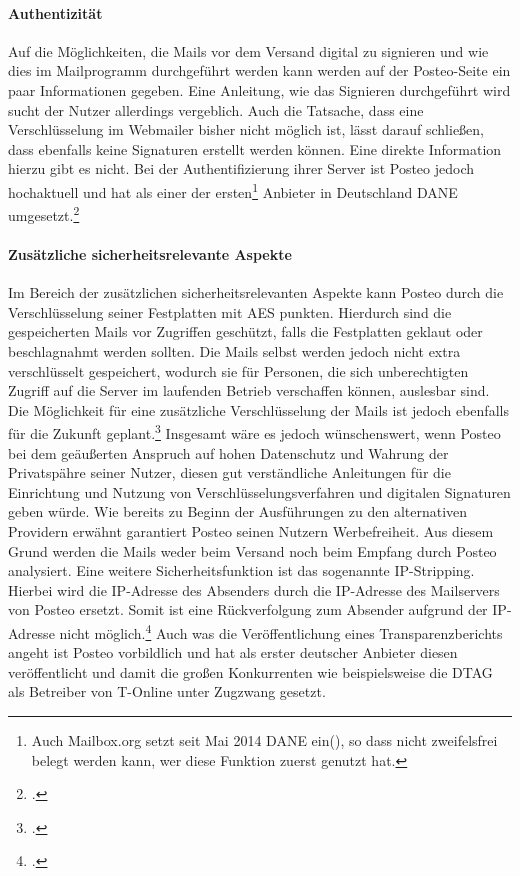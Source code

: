 \documentclass  [paper=a4,
				fontsize=12pt,
				listof=totoc,
				bibliography=totoc
				]{scrreprt}
\begin{document}
				\paragraph{Authentizität}
					Auf die Möglichkeiten, die Mails vor dem Versand digital zu signieren und wie dies im Mailprogramm durchgeführt werden kann werden auf der Posteo-Seite ein paar Informationen gegeben.
					Eine Anleitung, wie das Signieren durchgeführt wird sucht der Nutzer allerdings vergeblich.
					Auch die Tatsache, dass eine Verschlüsselung im Webmailer bisher nicht möglich ist, lässt darauf schließen, dass ebenfalls keine Signaturen erstellt werden können.
					Eine direkte Information hierzu gibt es nicht.
					Bei der Authentifizierung ihrer Server ist Posteo jedoch hochaktuell und hat als einer der ersten\footnote{Auch Mailbox.org setzt seit Mai 2014 \ac{DANE} ein(\cite[Vgl.][]{Mailbox2014a}), so dass nicht zweifelsfrei belegt werden kann, wer diese Funktion zuerst genutzt hat.} Anbieter in Deutschland \ac{DANE} umgesetzt.\footcite[Vgl.][]{Zivadino14-5}\medskip\\
				
				\paragraph{Zusätzliche sicherheitsrelevante Aspekte}
					Im Bereich der zusätzlichen sicherheitsrelevanten Aspekte kann Posteo durch die Verschlüsselung seiner Festplatten mit \ac{AES} punkten.
					Hierdurch sind die gespeicherten Mails vor Zugriffen geschützt, falls die Festplatten geklaut oder beschlagnahmt werden sollten.
					Die Mails selbst werden jedoch nicht extra verschlüsselt gespeichert, wodurch sie für Personen, die sich unberechtigten Zugriff auf die Server im laufenden Betrieb verschaffen können, auslesbar sind.
					Die Möglichkeit für eine zusätzliche Verschlüsselung der Mails ist jedoch ebenfalls für die Zukunft geplant.\footcite[Vgl.][]{Posteo2013c}
					Insgesamt wäre es jedoch wünschenswert, wenn Posteo bei dem geäußerten Anspruch auf hohen Datenschutz und Wahrung der Privatspähre seiner Nutzer, diesen gut verständliche Anleitungen für die Einrichtung und Nutzung von Verschlüsselungsverfahren und digitalen Signaturen geben würde.
					Wie bereits zu Beginn der Ausführungen zu den alternativen Providern erwähnt garantiert Posteo seinen Nutzern Werbefreiheit.
					Aus diesem Grund werden die Mails weder beim Versand noch beim Empfang durch Posteo analysiert.
					Eine weitere Sicherheitsfunktion ist das sogenannte \ac{IP}-Stripping.
					Hierbei wird die \ac{IP}-Adresse des Absenders durch die \ac{IP}-Adresse des Mailservers von Posteo ersetzt.
					Somit ist eine Rückverfolgung zum Absender aufgrund der \ac{IP}-Adresse nicht möglich.\footcite[Vgl.][]{Posteo2013a}
					Auch was die Veröffentlichung eines Transparenzberichts angeht ist Posteo vorbildlich und hat als erster deutscher Anbieter diesen veröffentlicht und damit die großen Konkurrenten wie beispielsweise die \ac{DTAG} als Betreiber von T-Online unter Zugzwang gesetzt.
				
\end{document}
